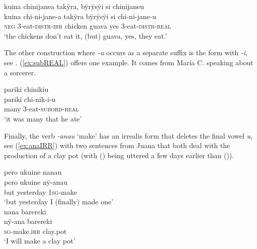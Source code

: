 \ea\label{ex:jane-real}
\begingl 
\glpreamble kuina chinijanea takÿra, bÿrÿsÿi si chinijaneu\\
\gla kuina chi-ni-jane-a takÿra bÿrÿsÿi si chi-ni-jane-u\\ 
\glb \textsc{neg} 3-eat-\textsc{distr}-\textsc{irr} chicken guava yes 3-eat-\textsc{distr}-\textsc{real}\\ 
\glft ‘the chickens don’t eat it, (but) guava, yes, they eat.’\\ 
\endgl
 \trailingcitation{[rxx-e121128s-3.24]}
\xe
{}

The other construction where \textit{-u} occurs as a separate suffix is the  form with \textit{-i}, see . (\ref{ex:subREAL}) offers one example. It comes from María C. speaking about a sorcerer.

\ea\label{ex:subREAL}
\begingl 
\glpreamble pariki chinikiu\\
\gla pariki chi-nik-i-u\\ 
\glb many 3-eat-\textsc{subord}-\textsc{real}\\ 
\glft ‘it was many that he ate’\\ 
\endgl
 \trailingcitation{[ump-p110815sf.597]}
\xe

Finally, the verb \textit{-anau} ‘make’ has an irrealis form that deletes the final vowel \textit{u}, see (\ref{ex:anaIRR}) with two sentences from Juana that both deal with the production of a clay pot (with () being uttered a few days earlier than ()).

\ea\label{ex:anaIRR}
  \ea\label{ex:anaIRR.1}
 \begingl 
\glpreamble pero ukuine nanau\\
\gla pero ukuine nÿ-anau\\ 
\glb but yesterday 1\textsc{sg}-make\\ 
\glft ‘but yesterday I (finally) made one’\\ 
\endgl
 \trailingcitation{[jxx-d110923l-1.15]}
  \ex\label{ex:anaIRR.2}
 \begingl
\glpreamble nana barereki\\
\gla nÿ-ana barereki\\
\textsc{sg}-make.\textsc{irr} clay.pot\\
\glft ‘I will make a clay pot’
\endgl
 \trailingcitation{[jmx-d110918ls-1.022]}
\z
\xe


